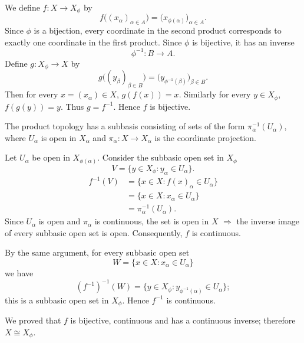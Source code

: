 
We define $f\colon X\to X_\phi$ by
\[ f\bigl((x_\alpha)_{\alpha\in A}\bigr)=\bigl(x_{\phi(\alpha)}\bigr)_{\alpha\in A}. \]
Since $\phi$ is a bijection, every coordinate in the second product corresponds to exactly one
coordinate in the first product. Since $\phi$ is bijective, it has an inverse
\[ \phi^{-1}\colon B\to A. \]
Define $g\colon X_\phi\to X$ by
\[ g\bigl((y_\beta)_{\beta\in B}\bigr)=\bigl(y_{\phi^{-1}(\beta)}\bigr)_{\beta\in B}. \]
Then for every $x=(x_\alpha)\in X$, $g(f(x))=x$. Similarly for every $y\in X_\phi$,
$f(g(y))=y$. Thus $g=f^{-1}$. Hence $f$ is bijective.

The product topology has a subbasis consisting of sets of the form $\pi_\alpha^{-1}(U_\alpha)$,
where $U_\alpha$ is open in $X_\alpha$ and $\pi_\alpha\colon X\to X_\alpha$ is the coordinate
projection.

Let $U_\alpha$ be open in $X_{\phi(\alpha)}$. Consider the subbasic open set in $X_\phi$
\[ V=\{y\in X_\phi : y_\alpha\in U_\alpha\}. \]
\begin{align*}
  f^{-1}(V) &= \{x\in X : f(x)_\alpha\in U_\alpha\}\\
            &= \{x\in X : x_\alpha\in U_\alpha\}\\
            &= \pi_\alpha^{-1}(U_\alpha).
\end{align*}
Since $U_\alpha$ is open and $\pi_\alpha$ is continuous, the set is open in $X$
$\Rightarrow$ the inverse image of every subbasic open set is open. Consequently, $f$ is
continuous.

By the same argument, for every subbasic open set
\[ W=\{x\in X : x_\alpha\in U_\alpha\} \]
we have
\[ (f^{-1})^{-1}(W)=\{y\in X_\phi : y_{\phi^{-1}(\alpha)}\in U_\alpha\}; \]
this is a subbasic open set in $X_\phi$. Hence $f^{-1}$ is continuous.

We proved that $f$ is bijective, continuous and has a continuous inverse; therefore
$X\cong X_\phi$.
